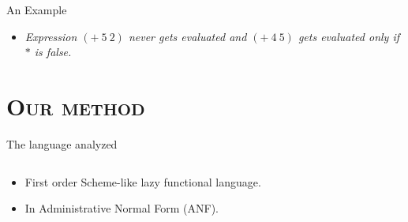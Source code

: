 \documentclass[xcolor=x11names,compress,mathserif]{beamer}
\renewcommand{\(}{\begin{columns}}
\renewcommand{\)}{\end{columns}}
\newcommand{\<}[1]{\begin{column}{#1}}
\renewcommand{\>}{\end{column}}
\begin{document}
\begin{frame}{An Example}


\bigskip
\begin{itemize}
\item<1->{\em  Expression $(+\ 5\ 2)$ never gets evaluated and $(+\ 4\ 5)$ gets evaluated only if $*$ is false.}  
\end{itemize}
\end{frame}

\section{\scshape Our method}



\begin{frame}{The language analyzed}
\begin{columns}
  \begin{column}[T]{0.45\textwidth}
\small
    \begin{itemize} \itemsep0.75em
    \item First order Scheme-like lazy functional language.
    \item In Administrative Normal Form (ANF).
    \end{itemize}
\normalsize
  \end{column}
  \begin{column}[T]{0.55\textwidth}
    
  \end{column}
\end{columns}
\end{frame}
\end{document}
